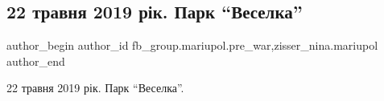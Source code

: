  
 
 
 
 

\subsection{22 травня 2019 рік. Парк \enquote{Веселка}}
\label{sec:14_03_2023.fb.fb_group.mariupol.pre_war.1.22_travnya_2019_r_k_}
 
\ifcmt
 author_begin
   author_id fb_group.mariupol.pre_war,zisser_nina.mariupol
 author_end
\fi

22 травня 2019 рік. Парк \enquote{Веселка}.

